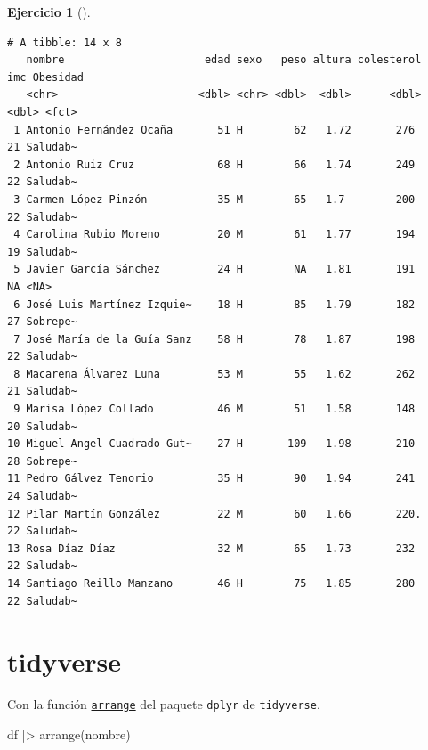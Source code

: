 \documentclass[
  a4paper,
]{scrreport}
\newenvironment{Shaded}{\begin{snugshade}}{\end{snugshade}}
\newcommand{\FunctionTok}[1]{\textcolor[rgb]{0.28,0.35,0.67}{#1}}
\newcommand{\NormalTok}[1]{\textcolor[rgb]{0.00,0.23,0.31}{#1}}
\newcommand{\SpecialCharTok}[1]{\textcolor[rgb]{0.37,0.37,0.37}{#1}}
\theoremstyle{definition}
\newtheorem{exercise}{Ejercicio}[chapter]
\theoremstyle{remark}
\begin{document}
\begin{exercise}[]
\begin{enumerate}
\begin{tcolorbox}
\begin{Shaded}
\end{Shaded}

\begin{verbatim}
# A tibble: 14 x 8
   nombre                      edad sexo   peso altura colesterol   imc Obesidad
   <chr>                      <dbl> <chr> <dbl>  <dbl>      <dbl> <dbl> <fct>   
 1 Antonio Fernández Ocaña       51 H        62   1.72       276     21 Saludab~
 2 Antonio Ruiz Cruz             68 H        66   1.74       249     22 Saludab~
 3 Carmen López Pinzón           35 M        65   1.7        200     22 Saludab~
 4 Carolina Rubio Moreno         20 M        61   1.77       194     19 Saludab~
 5 Javier García Sánchez         24 H        NA   1.81       191     NA <NA>    
 6 José Luis Martínez Izquie~    18 H        85   1.79       182     27 Sobrepe~
 7 José María de la Guía Sanz    58 H        78   1.87       198     22 Saludab~
 8 Macarena Álvarez Luna         53 M        55   1.62       262     21 Saludab~
 9 Marisa López Collado          46 M        51   1.58       148     20 Saludab~
10 Miguel Angel Cuadrado Gut~    27 H       109   1.98       210     28 Sobrepe~
11 Pedro Gálvez Tenorio          35 H        90   1.94       241     24 Saludab~
12 Pilar Martín González         22 M        60   1.66       220.    22 Saludab~
13 Rosa Díaz Díaz                32 M        65   1.73       232     22 Saludab~
14 Santiago Reillo Manzano       46 H        75   1.85       280     22 Saludab~
\end{verbatim}

  \section{tidyverse}

  Con la función
  \href{https://dplyr.tidyverse.org/reference/arrange.html}{\texttt{arrange}}
  del paquete \texttt{dplyr} de \texttt{tidyverse}.

\begin{Shaded}
\begin{Highlighting}[]
\NormalTok{df }\SpecialCharTok{|\textgreater{}} \FunctionTok{arrange}\NormalTok{(nombre)}
\end{Highlighting}
\end{Shaded}


\end{tcolorbox}
\end{enumerate}
\end{exercise}
\end{document}
